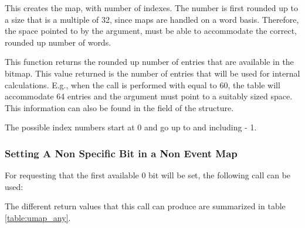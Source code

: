 
This creates the map, with  number of indexes. The
 number is first rounded up to a size that is a multiple of
32, since maps are handled on a word basis. Therefore, the space pointed to
by the  argument, must be able to accommodate the correct,
rounded up number of words.

This function returns the rounded up number of entries that are available in
the bitmap. This value returned is the number of entries that will be used
for internal calculations. E.g., when the call is performed with
 equal to 60, the table will accommodate 64 entries and the
 argument must point to a suitably sized space. This
information can also be found in the 
field of the  structure.

The possible index numbers start at 0 and go up to and including
 - 1.

\subsubsection{Setting A Non Specific Bit in a Non Event Map}

For requesting that the first available 0 bit will be set, the following
call can be used:


The different return values that this call can produce are summarized
in table \ref{table:umap_any}.  



